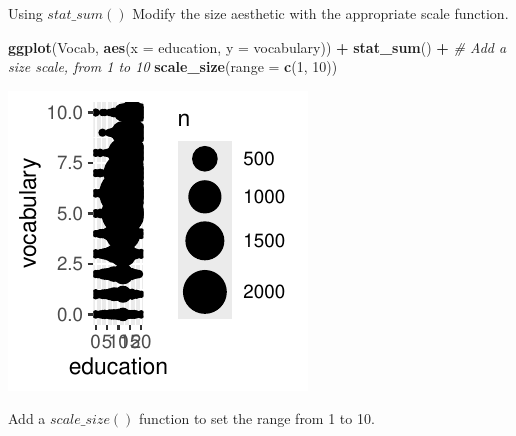 \documentclass[
  ignorenonframetext,
]{beamer}
\newenvironment{Shaded}{\begin{snugshade}}{\end{snugshade}}
\newcommand{\AttributeTok}[1]{\textcolor[rgb]{0.13,0.29,0.53}{#1}}
\newcommand{\CommentTok}[1]{\textcolor[rgb]{0.56,0.35,0.01}{\textit{#1}}}
\newcommand{\DecValTok}[1]{\textcolor[rgb]{0.00,0.00,0.81}{#1}}
\newcommand{\FunctionTok}[1]{\textcolor[rgb]{0.13,0.29,0.53}{\textbf{#1}}}
\newcommand{\NormalTok}[1]{#1}
\newcommand{\SpecialCharTok}[1]{\textcolor[rgb]{0.81,0.36,0.00}{\textbf{#1}}}
\begin{document}
\begin{frame}[fragile]{Using \(stat\_sum()\)}
\label{using-stat_sum-5}
Modify the size aesthetic with the appropriate scale function.


\begin{Shaded}
\begin{Highlighting}[]
\FunctionTok{ggplot}\NormalTok{(Vocab, }\FunctionTok{aes}\NormalTok{(}\AttributeTok{x =}\NormalTok{ education, }\AttributeTok{y =}\NormalTok{ vocabulary)) }\SpecialCharTok{+} \FunctionTok{stat\_sum}\NormalTok{() }\SpecialCharTok{+}
    \CommentTok{\# Add a size scale, from 1 to 10}
\FunctionTok{scale\_size}\NormalTok{(}\AttributeTok{range =} \FunctionTok{c}\NormalTok{(}\DecValTok{1}\NormalTok{, }\DecValTok{10}\NormalTok{))}
\end{Highlighting}
\end{Shaded}

\begin{center}\includegraphics[width=0.5\linewidth]{Figs/unnamed-chunk-22-1} \end{center}

Add a \(scale\_size()\) function to set the range from 1 to 10.
\end{frame}
\end{document}
